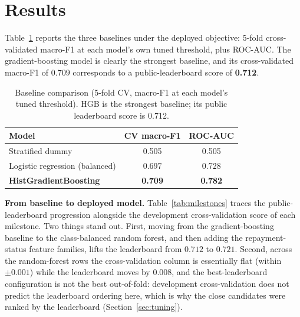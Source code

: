 \documentclass[conference]{IEEEtran}
\begin{document}
\section{Results}
\label{sec:results}
Table~\ref{tab:baseline} reports the three baselines under the deployed objective:
5-fold cross-validated macro-F1 at each model's own tuned threshold, plus
ROC-AUC. The gradient-boosting model is clearly the strongest baseline, and its
cross-validated macro-F1 of $0.709$ corresponds to a public-leaderboard score of
\textbf{0.712}.

\begin{table}[t]
\caption{Baseline comparison (5-fold CV, macro-F1 at each model's tuned
threshold). HGB is the strongest baseline; its public leaderboard score is 0.712.}
\label{tab:baseline}
\centering
\begin{tabular}{lcc}
\toprule
Model & CV macro-F1 & ROC-AUC \\
\midrule
Stratified dummy            & 0.505 & 0.505 \\
Logistic regression (balanced) & 0.697 & 0.728 \\
\textbf{HistGradientBoosting} & \textbf{0.709} & \textbf{0.782} \\
\bottomrule
\end{tabular}
\end{table}

\textbf{From baseline to deployed model.} Table~\ref{tab:milestones} traces the
public-leaderboard progression alongside the development cross-validation score of
each milestone. Two things stand out. First, moving from the gradient-boosting
baseline to the class-balanced random forest, and then adding the repayment-status
feature families, lifts the leaderboard from $0.712$ to $0.721$. Second, across the
random-forest rows the cross-validation column is essentially flat (within
$\pm 0.001$) while the leaderboard moves by $0.008$, and the best-leaderboard
configuration is not the best out-of-fold: development cross-validation does not
predict the leaderboard ordering here, which is why the close candidates were
ranked by the leaderboard (Section~\ref{sec:tuning}).
\end{document}
